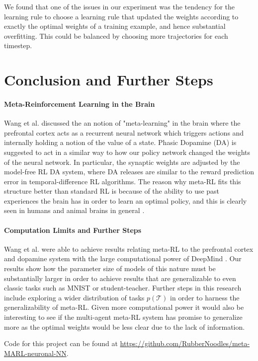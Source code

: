 \documentclass{article}
\begin{document}
We found that one of the issues in our experiment was the tendency for the learning rule to choose a 
learning rule that updated the weights according to exactly the optimal weights of a training example, 
and hence substantial overfitting. This could be balanced
by choosing more trajectories for each timestep. 
\section{Conclusion and Further Steps}

\paragraph{Meta-Reinforcement Learning in the Brain} Wang et al. discussed the 
an notion of "meta-learning" in the brain where the prefrontal cortex acts as a recurrent neural network which triggers actions
and internally holding a notion of the value of a state. Phasic Dopamine (DA) is suggested to act in a similar way to
how our policy network changed the weights of the neural network. In particular, the synaptic weights are adjusted
by the model-free RL DA system, where DA releases are similar to the reward prediction error in temporal-difference 
RL algorithms. The reason why meta-RL fits this structure better than standard RL is because of the ability to use past 
experiences the brain has in order to learn an optimal policy, and this is clearly seen in humans and animal brains in general \cite{wang2018pfc}.

\paragraph{Computation Limits and Further Steps} Wang et al. were able to achieve results relating meta-RL to the prefrontal cortex and 
dopamine system with the large computational power of DeepMind \cite{wang2018pfc}. 
Our results show how the parameter size of models of this nature must be substantially 
larger in order to achieve results that are generalizable to even classic tasks such as
MNIST or student-teacher. Further steps in this research include exploring a wider distribution
of tasks $p(\mathcal{T})$ in order to harness the generalizability of meta-RL. Given more computational
power it would also be interesting to see if the multi-agent meta-RL system has promise to generalize
more as the optimal weights would be less clear due to the lack of information.

Code for this project can be found at \url{https://github.com/RubberNoodles/meta-MARL-neuronal-NN}.

 
\end{document}
